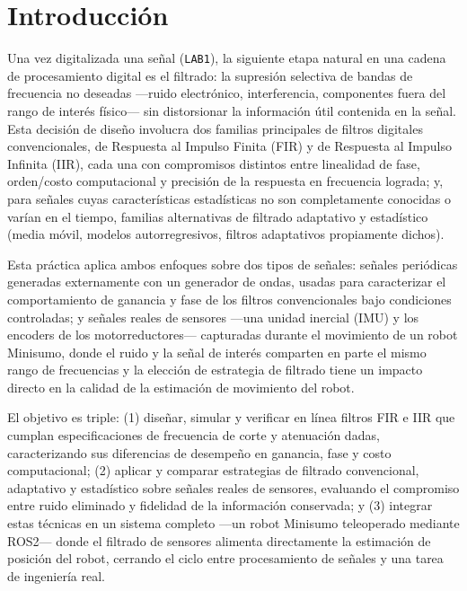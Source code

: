 
\section{Introducción}

Una vez digitalizada una señal (\texttt{LAB1}), la siguiente etapa natural en una cadena de procesamiento digital es el filtrado: la supresión selectiva de bandas de frecuencia no deseadas —ruido electrónico, interferencia, componentes fuera del rango de interés físico— sin distorsionar la información útil contenida en la señal. Esta decisión de diseño involucra dos familias principales de filtros digitales convencionales, de Respuesta al Impulso Finita (FIR) y de Respuesta al Impulso Infinita (IIR), cada una con compromisos distintos entre linealidad de fase, orden/costo computacional y precisión de la respuesta en frecuencia lograda; y, para señales cuyas características estadísticas no son completamente conocidas o varían en el tiempo, familias alternativas de filtrado adaptativo y estadístico (media móvil, modelos autorregresivos, filtros adaptativos propiamente dichos).

Esta práctica aplica ambos enfoques sobre dos tipos de señales: señales periódicas generadas externamente con un generador de ondas, usadas para caracterizar el comportamiento de ganancia y fase de los filtros convencionales bajo condiciones controladas; y señales reales de sensores —una unidad inercial (IMU) y los encoders de los motorreductores— capturadas durante el movimiento de un robot Minisumo, donde el ruido y la señal de interés comparten en parte el mismo rango de frecuencias y la elección de estrategia de filtrado tiene un impacto directo en la calidad de la estimación de movimiento del robot.

El objetivo es triple: (1) diseñar, simular y verificar en línea filtros FIR e IIR que cumplan especificaciones de frecuencia de corte y atenuación dadas, caracterizando sus diferencias de desempeño en ganancia, fase y costo computacional; (2) aplicar y comparar estrategias de filtrado convencional, adaptativo y estadístico sobre señales reales de sensores, evaluando el compromiso entre ruido eliminado y fidelidad de la información conservada; y (3) integrar estas técnicas en un sistema completo —un robot Minisumo teleoperado mediante ROS2— donde el filtrado de sensores alimenta directamente la estimación de posición del robot, cerrando el ciclo entre procesamiento de señales y una tarea de ingeniería real.
